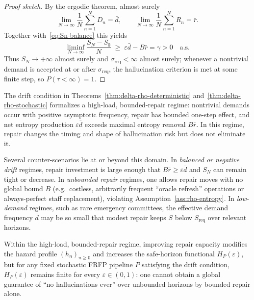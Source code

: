\begin{proof}[Proof sketch]
By the ergodic theorem, almost surely
\[
  \lim_{N \to \infty} \frac{1}{N}\sum_{n=1}^N D_n = \bar{d},
  \qquad
  \lim_{N \to \infty} \frac{1}{N}\sum_{n=1}^N R_n = \bar{r}.
\]
Together with~\eqref{eq:Sn-balance} this yields
\[
  \liminf_{N \to \infty} \frac{S_N - S_0}{N} \;\ge\; \varepsilon \bar{d} - B \bar{r} = \gamma > 0
  \quad\text{a.s.}
\]
Thus $S_N \to +\infty$ almost surely and $\sigma_{\mathrm{req}} < \infty$ almost surely; whenever a
nontrivial demand is accepted at or after $\sigma_{\mathrm{req}}$, the hallucination criterion is met at
some finite step, so $P(\tau < \infty) = 1$.
\end{proof}
\begin{remark}\label{rem:delta-rho-counter}
The drift condition in Theorems~\ref{thm:delta-rho-deterministic} and~\ref{thm:delta-rho-stochastic}
formalizes a high-load, bounded-repair regime: nontrivial demands occur with positive asymptotic
frequency, repair has bounded one-step effect, and net entropy production $\varepsilon \bar{d}$
exceeds maximal entropy removal $B \bar{r}$. In this regime, repair changes the timing and shape
of hallucination risk but does not eliminate it.

Several counter-scenarios lie at or beyond this domain. In \emph{balanced or negative drift}
regimes, repair investment is large enough that $B \bar{r} \ge \varepsilon \bar{d}$ and $S_N$ can remain
tight or decrease. In \emph{unbounded repair} regimes, one allows repair moves with no global
bound $B$ (e.g.\ costless, arbitrarily frequent ``oracle refresh'' operations or always-perfect staff
replacement), violating Assumption~\ref{ass:rho-entropy}. In \emph{low-demand} regimes, such as
rare emergency committees, the effective demand frequency $\bar{d}$ may be so small that modest
repair keeps $S$ below $S_{\mathrm{req}}$ over relevant horizons.

Within the high-load, bounded-repair regime, improving repair capacity modifies the hazard profile
$(h_n)_{n \ge 0}$ and increases the safe-horizon functional $H_P(\varepsilon)$, but for any fixed
stochastic FRFP pipeline $P$ satisfying the drift condition, $H_P(\varepsilon)$ remains finite for every
$\varepsilon \in (0,1)$: one cannot obtain a global guarantee of ``no hallucinations ever'' over
unbounded horizons by bounded repair alone.
\end{remark}

